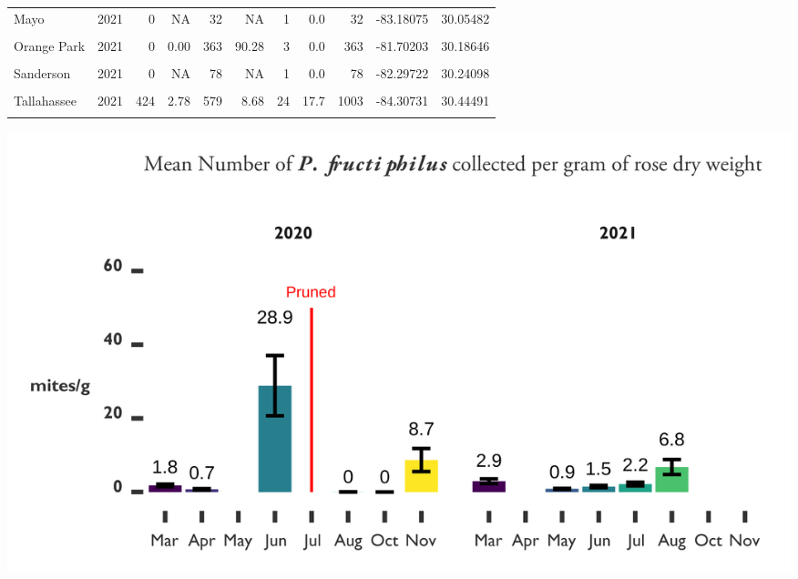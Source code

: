 \documentclass[12pt,final,CPage]{ufthesis}
\begin{document}
{\begin{table}[H]
{\begin{tabular}{lrrrrrrrrrr}
  Mayo & 2021 & 0 & NA & 32 & NA & 1 & 0.0 & 32 & -83.18075 & 30.05482\\
  \cellcolor{gray!6}{Monticello} & \cellcolor{gray!6}{2021} & \cellcolor{gray!6}{0} & \cellcolor{gray!6}{NA} & \cellcolor{gray!6}{20} & \cellcolor{gray!6}{NA} & \cellcolor{gray!6}{1} & \cellcolor{gray!6}{0.0} & \cellcolor{gray!6}{20} & \cellcolor{gray!6}{-83.87114} & \cellcolor{gray!6}{30.54514}\\
  \addlinespace
  Orange Park & 2021 & 0 & 0.00 & 363 & 90.28 & 3 & 0.0 & 363 & -81.70203 & 30.18646\\
  \cellcolor{gray!6}{Perry} & \cellcolor{gray!6}{2021} & \cellcolor{gray!6}{0} & \cellcolor{gray!6}{NA} & \cellcolor{gray!6}{3} & \cellcolor{gray!6}{NA} & \cellcolor{gray!6}{1} & \cellcolor{gray!6}{0.0} & \cellcolor{gray!6}{3} & \cellcolor{gray!6}{-83.57833} & \cellcolor{gray!6}{30.11150}\\
  Sanderson & 2021 & 0 & NA & 78 & NA & 1 & 0.0 & 78 & -82.29722 & 30.24098\\
  \cellcolor{gray!6}{Sneads} & \cellcolor{gray!6}{2021} & \cellcolor{gray!6}{0} & \cellcolor{gray!6}{NA} & \cellcolor{gray!6}{1} & \cellcolor{gray!6}{NA} & \cellcolor{gray!6}{1} & \cellcolor{gray!6}{0.0} & \cellcolor{gray!6}{1} & \cellcolor{gray!6}{-84.91279} & \cellcolor{gray!6}{30.71067}\\
  Tallahassee & 2021 & 424 & 2.78 & 579 & 8.68 & 24 & 17.7 & 1003 & -84.30731 & 30.44491\\
  \addlinespace
  \textbf{\cellcolor{gray!6}{Grand Totals}} & \textbf{\cellcolor{gray!6}{2021}} & \textbf{\cellcolor{gray!6}{8679}} & \textbf{\cellcolor{gray!6}{NA}} & \textbf{\cellcolor{gray!6}{4674}} & \textbf{\cellcolor{gray!6}{NA}} & \textbf{\cellcolor{gray!6}{425}} & \textbf{\cellcolor{gray!6}{127.9}} & \textbf{\cellcolor{gray!6}{13353}} & \textbf{\cellcolor{gray!6}{-83.71379}} & \textbf{\cellcolor{gray!6}{30.25158}}\\
  \bottomrule
  \end{tabular}}
  \end{table}
  \pagebreak
  \begin{center}\includegraphics[width=1\linewidth]{figure/rrv_pheno_bargraph} \end{center}

}
\end{document}

